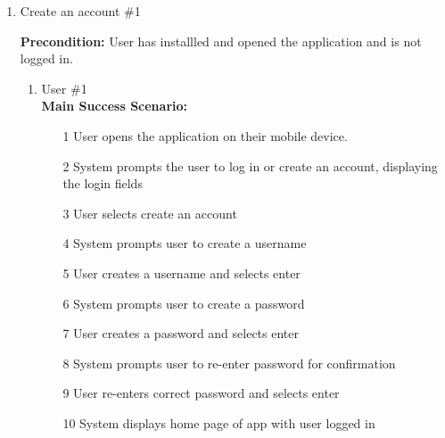 \documentclass[]{article}
\begin{document}


\begin{enumerate}[{\bf BE1.}]
        \item Create an account \#1
        
        \textbf{Precondition:} User has installled and opened the application and is not logged in.
        \begin{enumerate}[{\bf VP1.}]
            \item User \#1 \\
                \textbf{Main Success Scenario:}
                \begin{enumerate}
                    \item[1] User opens the application on their mobile device.
                    \item[2] System prompts the user to log in or create an account, displaying the login fields
                    \item[3] User selects create an account
                    \item[4] System prompts user to create a username
                    \item[5] User creates a username and selects enter
                    \item[6] System prompts user to create a password
                    \item[7] User creates a password and selects enter
                    \item[8] System prompts user to re-enter password for confirmation
                    \item[9] User re-enters correct password and selects enter
                    \item[10] System displays home page of app with user logged in
                \end{enumerate}
    

\end{enumerate}
\end{enumerate}
\end{document}
